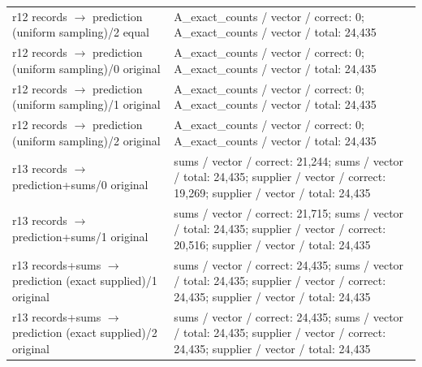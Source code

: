 \begin{longtable}{@{}>{\raggedright\arraybackslash}p{1.800in}>{\raggedright\arraybackslash}p{4.200in}@{}}
r12 records $\to$ prediction (uniform sampling)/\allowbreak{}2 equal & A\_\allowbreak{}exact\_\allowbreak{}counts /\allowbreak{} vector /\allowbreak{} correct: 0; A\_\allowbreak{}exact\_\allowbreak{}counts /\allowbreak{} vector /\allowbreak{} total: 24,435 \\
r12 records $\to$ prediction (uniform sampling)/\allowbreak{}0 original & A\_\allowbreak{}exact\_\allowbreak{}counts /\allowbreak{} vector /\allowbreak{} correct: 0; A\_\allowbreak{}exact\_\allowbreak{}counts /\allowbreak{} vector /\allowbreak{} total: 24,435 \\
r12 records $\to$ prediction (uniform sampling)/\allowbreak{}1 original & A\_\allowbreak{}exact\_\allowbreak{}counts /\allowbreak{} vector /\allowbreak{} correct: 0; A\_\allowbreak{}exact\_\allowbreak{}counts /\allowbreak{} vector /\allowbreak{} total: 24,435 \\
r12 records $\to$ prediction (uniform sampling)/\allowbreak{}2 original & A\_\allowbreak{}exact\_\allowbreak{}counts /\allowbreak{} vector /\allowbreak{} correct: 0; A\_\allowbreak{}exact\_\allowbreak{}counts /\allowbreak{} vector /\allowbreak{} total: 24,435 \\
r13 records $\to$ prediction+sums/\allowbreak{}0 original & sums /\allowbreak{} vector /\allowbreak{} correct: 21,244; sums /\allowbreak{} vector /\allowbreak{} total: 24,435; supplier /\allowbreak{} vector /\allowbreak{} correct: 19,269; supplier /\allowbreak{} vector /\allowbreak{} total: 24,435 \\
r13 records $\to$ prediction+sums/\allowbreak{}1 original & sums /\allowbreak{} vector /\allowbreak{} correct: 21,715; sums /\allowbreak{} vector /\allowbreak{} total: 24,435; supplier /\allowbreak{} vector /\allowbreak{} correct: 20,516; supplier /\allowbreak{} vector /\allowbreak{} total: 24,435 \\
r13 records+sums $\to$ prediction (exact supplied)/\allowbreak{}1 original & sums /\allowbreak{} vector /\allowbreak{} correct: 24,435; sums /\allowbreak{} vector /\allowbreak{} total: 24,435; supplier /\allowbreak{} vector /\allowbreak{} correct: 24,435; supplier /\allowbreak{} vector /\allowbreak{} total: 24,435 \\
r13 records+sums $\to$ prediction (exact supplied)/\allowbreak{}2 original & sums /\allowbreak{} vector /\allowbreak{} correct: 24,435; sums /\allowbreak{} vector /\allowbreak{} total: 24,435; supplier /\allowbreak{} vector /\allowbreak{} correct: 24,435; supplier /\allowbreak{} vector /\allowbreak{} total: 24,435 \\

\end{longtable}
